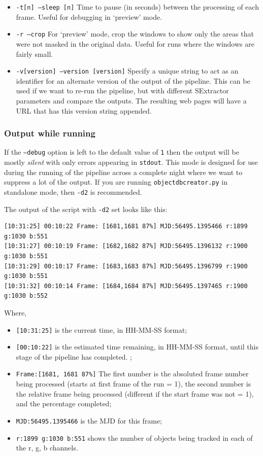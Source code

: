\begin{itemize}
  \item \texttt{-t[n] --sleep [n]} Time to pause (in seconds) between the processing of each frame. Useful for debugging in `preview' mode. 
  \item \texttt{-r --crop} For `preview' mode, crop the windows to show only the areas that were not masked in the original data. Useful for runs where the windows are fairly small. 
  \item \texttt{-v[version] --version [version]} Specify a unique string to act as an identifier for an alternate version of the output of the pipeline. This can be used if we want to re-run the pipeline, but with different SExtractor parameters and compare the outputs. The resulting web pages will have a URL that has this version string appended.    

\end{itemize}

\subsubsection{Output while running}\label{sect:output}
If the \texttt{--debug} option is left to the default value of \texttt{1} then the output will be mostly \emph{silent} with only errors appearing in \texttt{stdout}. This mode is designed for use during the running of the pipeline across a complete night where we want to suppress a lot of the output. If you are running \texttt{objectdbcreator.py} in standalone mode, then \texttt{-d2} is recommended. 

The output of the script with \texttt{-d2} set looks like this:

\begin{lstlisting}
[10:31:25] 00:10:22 Frame: [1681,1681 87%] MJD:56495.1395466 r:1899 g:1030 b:551 
[10:31:27] 00:10:19 Frame: [1682,1682 87%] MJD:56495.1396132 r:1900 g:1030 b:551 
[10:31:29] 00:10:17 Frame: [1683,1683 87%] MJD:56495.1396799 r:1900 g:1030 b:551 
[10:31:32] 00:10:14 Frame: [1684,1684 87%] MJD:56495.1397465 r:1900 g:1030 b:552 
\end{lstlisting}

Where, 
\begin{itemize}
  \item \texttt{[10:31:25]} is the current time, in HH-MM-SS format;
  \item \texttt{[00:10:22]} is the estimated time remaining, in HH-MM-SS format, until this stage of the pipeline has completed. ;
  \item \texttt{Frame:[1681, 1681 87\%]} The first number is the absoluted frame number being processed (starts at first frame of the run = 1), the second number is the relative frame being processed (different if the start frame was not = 1), and the percentage completed;
  \item \texttt{MJD:56495.1395466} is the MJD for this frame;
  \item \texttt{r:1899 g:1030 b:551} shows the number of objects being tracked in each of the r, g, b channels.
\end{itemize}

